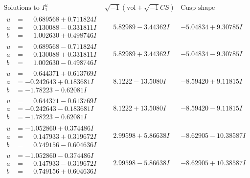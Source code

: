 \documentclass[1p]{elsarticle_modified}
\theoremstyle{definition}
\newcommand{\I}{\sqrt{-1}}
\begin{document}
$$\begin{array}{c|c|c}  
\text{Solutions to }I^u_{1}& \I (\text{vol} + \sqrt{-1}CS) & \text{Cusp shape}\\
 \hline 
\begin{aligned}
u &= \phantom{-}0.689568 + 0.711824 I \\
a &= \phantom{-}0.130088 - 0.331811 I \\
b &= \phantom{-}1.002630 + 0.498746 I\end{aligned}
 & \phantom{-}5.82989 - 3.44362 I & -5.04834 + 9.30785 I \\ \hline\begin{aligned}
u &= \phantom{-}0.689568 - 0.711824 I \\
a &= \phantom{-}0.130088 + 0.331811 I \\
b &= \phantom{-}1.002630 - 0.498746 I\end{aligned}
 & \phantom{-}5.82989 + 3.44362 I & -5.04834 - 9.30785 I \\ \hline\begin{aligned}
u &= \phantom{-}0.644371 + 0.613769 I \\
a &= -0.242643 + 0.183681 I \\
b &= -1.78223 - 0.62081 I\end{aligned}
 & \phantom{-}8.1222 - 13.5080 I & -8.59420 + 9.11815 I \\ \hline\begin{aligned}
u &= \phantom{-}0.644371 - 0.613769 I \\
a &= -0.242643 - 0.183681 I \\
b &= -1.78223 + 0.62081 I\end{aligned}
 & \phantom{-}8.1222 + 13.5080 I & -8.59420 - 9.11815 I \\ \hline\begin{aligned}
u &= -1.052860 + 0.374486 I \\
a &= \phantom{-}0.147933 + 0.319672 I \\
b &= \phantom{-}0.749156 - 0.604636 I\end{aligned}
 & \phantom{-}2.99598 + 5.86638 I & -8.62905 - 10.38587 I \\ \hline\begin{aligned}
u &= -1.052860 - 0.374486 I \\
a &= \phantom{-}0.147933 - 0.319672 I \\
b &= \phantom{-}0.749156 + 0.604636 I\end{aligned}
 & \phantom{-}2.99598 - 5.86638 I & -8.62905 + 10.38587 I \\ \hline\begin{aligned}

\end{aligned}
\end{array}$$
\end{document}

